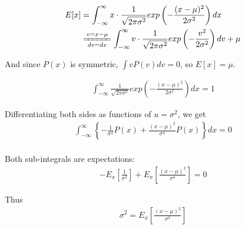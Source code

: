\begin{problem}
  \begin{align*}
    E[x] &= \int_{-\infty}^{\infty} x \cdot \frac{1}{\sqrt{2\pi \sigma^2}}
      exp \left(-\frac{(x-\mu)^2}{2\sigma^2}\right) dx \\
         &\xlongequal[dv = dx]{v = x - \mu}
         \int_{-\infty}^{\infty} v \cdot \frac{1}{\sqrt{2\pi \sigma^2}}
         exp \left(-\frac{v^2}{2\sigma^2}\right) dv + \mu
  \end{align*}

  And since $P(x)$ is symmetric, $\int v P(v) dv = 0$, so $E[x] = \mu$.

  \begin{align*}
    \int_{-\infty}^{\infty} \frac{1}{\sqrt{2\pi \sigma^2}}
      exp \left(-\frac{(x-\mu)^2}{2\sigma^2}\right) dx = 1
  \end{align*}

  Differentiating both sides as functions of $u = \sigma^2$, we get
  \begin{align*}
    \int_{-\infty}^{\infty} \left\{ -\frac{1}{\sigma^2} P(x) +
                                     \frac{(x - \mu)^2}{\sigma^4} P(x)
                            \right\} dx = 0 \\
  \end{align*}

  Both sub-integrals are expectations:
  \begin{align*}
    -E_x\left[ \frac{1}{\sigma^2} \right] +
     E_x\left[ \frac{(x - \mu)^2}{\sigma^4} \right] = 0
  \end{align*}

  Thus
  \begin{align*}
    \sigma^2 = E_x\left[ \frac{(x - \mu)^2}{\sigma^2} \right]
  \end{align*}
\end{problem}

